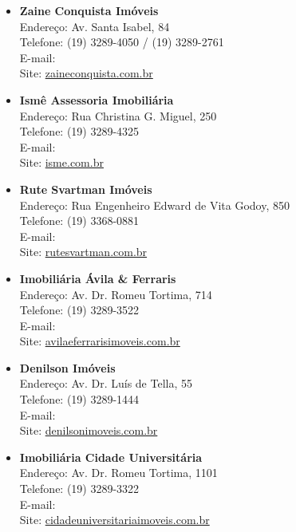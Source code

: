 \begin{itemize}
    \item   \textbf{Zaine Conquista Imóveis}
        \\Endereço: Av. Santa Isabel, 84
        \\Telefone: (19) 3289-4050 / (19) 3289-2761
        \\E-mail: 
        \\Site: \url{zaineconquista.com.br}

    \item   \textbf{Ismê Assessoria Imobiliária}
        \\Endereço: Rua Christina G. Miguel, 250
        \\Telefone: (19) 3289-4325
        \\E-mail: 
        \\Site: \url{isme.com.br}

    \item   \textbf{Rute Svartman Imóveis}
        \\Endereço: Rua Engenheiro Edward de Vita Godoy, 850
        \\Telefone: (19) 3368-0881
        \\E-mail: 
        \\Site: \url{rutesvartman.com.br}

    \item   \textbf{Imobiliária Ávila \& Ferraris}
        \\Endereço: Av. Dr. Romeu Tortima, 714
        \\Telefone: (19) 3289-3522
        \\E-mail: 
        \\Site: \url{avilaeferrarisimoveis.com.br}

    \item   \textbf{Denilson Imóveis}
        \\Endereço: Av. Dr. Luís de Tella, 55
        \\Telefone: (19) 3289-1444
        \\E-mail: 
        \\Site: \url{denilsonimoveis.com.br}

    \item   \textbf{Imobiliária Cidade Universitária}
        \\Endereço: Av. Dr. Romeu Tortima, 1101
        \\Telefone: (19) 3289-3322
        \\E-mail: 
        \\Site: \url{cidadeuniversitariaimoveis.com.br}


\end{itemize}
